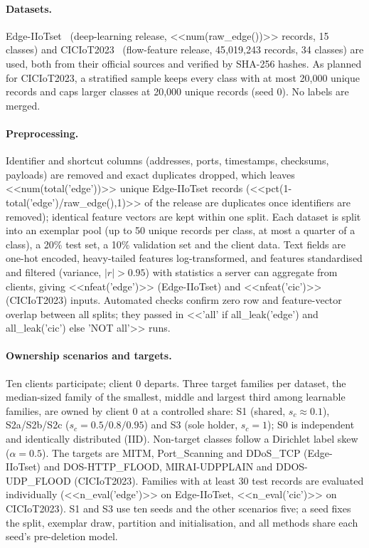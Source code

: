 \documentclass[pdflatex,sn-mathphys-num,iicol]{sn-jnl}
\begin{document}
\paragraph{Datasets.} Edge-IIoTset~\cite{ferrag2022} (deep-learning release, <<num(raw_edge())>> records, 15 classes) and CICIoT2023~\cite{neto2023} (flow-feature release, 45{,}019{,}243 records, 34 classes) are used, both from their official sources and verified by SHA-256 hashes. As planned for CICIoT2023, a stratified sample keeps every class with at most 20{,}000 unique records and caps larger classes at 20{,}000 unique records (seed 0). No labels are merged.

\paragraph{Preprocessing.} Identifier and shortcut columns (addresses, ports, timestamps, checksums, payloads) are removed and exact duplicates dropped, which leaves <<num(total('edge'))>> unique Edge-IIoTset records (<<pct(1-total('edge')/raw_edge(),1)>> of the release are duplicates once identifiers are removed); identical feature vectors are kept within one split. Each dataset is split into an exemplar pool (up to 50 unique records per class, at most a quarter of a class), a 20\% test set, a 10\% validation set and the client data. Text fields are one-hot encoded, heavy-tailed features log-transformed, and features standardised and filtered (variance, $|r|>0.95$) with statistics a server can aggregate from clients, giving <<nfeat('edge')>> (Edge-IIoTset) and <<nfeat('cic')>> (CICIoT2023) inputs. Automated checks confirm zero row and feature-vector overlap between all splits; they passed in <<'all' if all_leak('edge') and all_leak('cic') else 'NOT all'>> runs.

\paragraph{Ownership scenarios and targets.} Ten clients participate; client 0 departs. Three target families per dataset, the median-sized family of the smallest, middle and largest third among learnable families, are owned by client 0 at a controlled share: S1 (shared, $s_c\approx0.1$), S2a/S2b/S2c ($s_c=0.5/0.8/0.95$) and S3 (sole holder, $s_c=1$); S0 is independent and identically distributed (IID). Non-target classes follow a Dirichlet label skew ($\alpha=0.5$). The targets are MITM, Port\_Scanning and DDoS\_TCP (Edge-IIoTset) and DOS-HTTP\_FLOOD, MIRAI-UDPPLAIN and DDOS-UDP\_FLOOD (CICIoT2023). Families with at least 30 test records are evaluated individually (<<n_eval('edge')>> on Edge-IIoTset, <<n_eval('cic')>> on CICIoT2023). S1 and S3 use ten seeds and the other scenarios five; a seed fixes the split, exemplar draw, partition and initialisation, and all methods share each seed's pre-deletion model.
\end{document}

